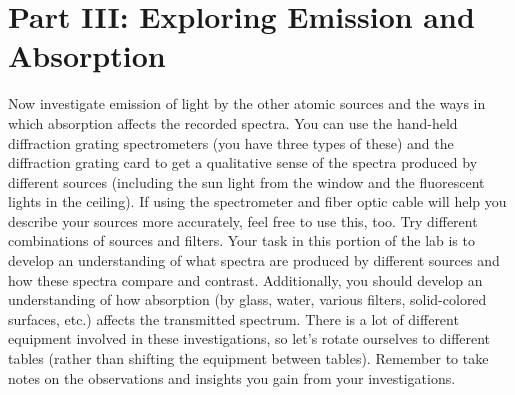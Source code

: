 \section*{Part III: Exploring Emission and Absorption}
Now investigate emission of light by the other atomic sources and the ways in which absorption affects the recorded spectra. 
You can use the hand-held diffraction grating spectrometers (you have three types of these) and the diffraction grating card to get a qualitative sense of the spectra produced by different sources (including the sun light from the window and the fluorescent lights in the ceiling). 
If using the spectrometer and fiber optic cable will help you describe your sources more accurately, feel free to use this, too. 
Try different combinations of sources and filters. 
Your task in this portion of the lab is to develop an understanding of what spectra are produced by different sources and how these spectra compare and contrast. 
Additionally, you should develop an understanding of how absorption (by glass, water, various filters, solid-colored surfaces, etc.) affects the transmitted spectrum. 
There is a lot of different equipment involved in these investigations, so let's rotate ourselves to different tables (rather than shifting the equipment between tables). 
Remember to take notes on the observations and insights you gain from your investigations. 

